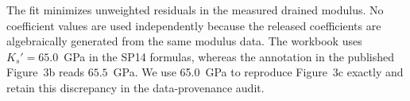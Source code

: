 The fit minimizes unweighted residuals in the measured drained modulus.  No
coefficient values are used independently because the released coefficients
are algebraically generated from the same modulus data.  The workbook uses
\(K_s'=65.0\)~GPa in the SP14 formulas, whereas the annotation in the published
Figure~3b reads \(65.5\)~GPa.  We use 65.0~GPa to reproduce Figure~3c exactly
and retain this discrepancy in the data-provenance audit.

